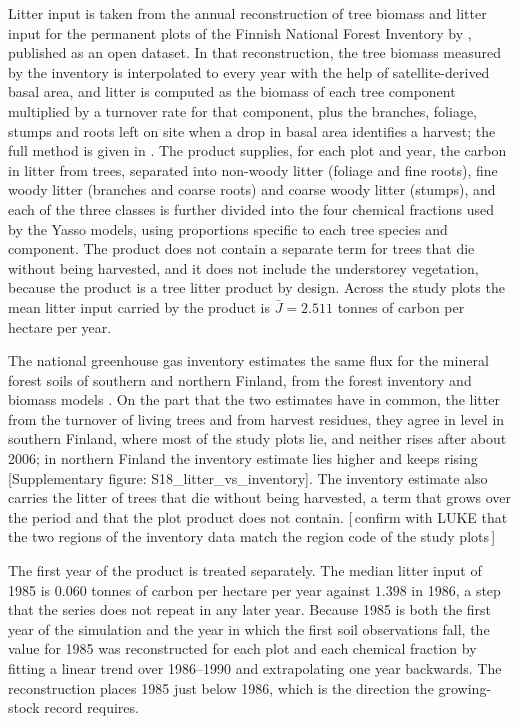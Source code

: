 \documentclass[11pt]{article}
\newcommand{\gap}[1]{\textcolor{red!70!black}{\small[\,#1\,]}}
\newcommand{\suppfig}[1]{\textcolor{blue!55!black}{\small[Supplementary figure: \textsf{#1}]}}
\begin{document}
Litter input is taken from the annual reconstruction of tree biomass and litter input for the
permanent plots of the Finnish National Forest Inventory by \citet{TupekLitter}, published as
an open dataset. In that reconstruction, the tree biomass measured by the inventory is
interpolated to every year with the help of satellite-derived basal area, and litter is
computed as the biomass of each tree component multiplied by a turnover rate for that
component, plus the branches, foliage, stumps and roots left on site when a drop in basal
area identifies a harvest; the full method is given in \citet{TupekLitter}. The product
supplies, for each plot and year, the carbon in litter from trees, separated into non-woody
litter (foliage and fine roots), fine woody litter (branches and coarse roots) and coarse
woody litter (stumps), and each of the three classes is further divided into the four
chemical fractions used by the Yasso models, using proportions specific to each tree species
and component. The product does not contain a separate term for trees that die without being
harvested, and it does not include the understorey vegetation, because the product is a tree
litter product by design. Across the study plots the mean litter input carried by the product
is $\bar{J} = 2.511$ tonnes of carbon per hectare per year.

The national greenhouse gas inventory estimates the same flux for the mineral forest soils of
southern and northern Finland, from the forest inventory and biomass models
\citep{StatFin2025NID}. On the part that the two estimates have in common, the litter from
the turnover of living trees and from harvest residues, they agree in level in southern
Finland, where most of the study plots lie, and neither rises after about 2006; in northern
Finland the inventory estimate lies higher and keeps rising
\suppfig{S18\_litter\_vs\_inventory}. The inventory estimate also carries the litter of trees
that die without being harvested, a term that grows over the period and that the plot product
does not contain. \gap{confirm with LUKE that the two regions of the inventory data match the
region code of the study plots}

The first year of the product is treated separately. The median litter input of 1985 is
$0.060$ tonnes of carbon per hectare per year against $1.398$ in 1986, a step that the series
does not repeat in any later year. Because 1985 is both the first year of the simulation and
the year in which the first soil observations fall, the value for 1985 was reconstructed for
each plot and each chemical fraction by fitting a linear trend over 1986--1990 and
extrapolating one year backwards. The reconstruction places 1985 just below 1986, which is
the direction the growing-stock record requires.
\end{document}
